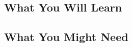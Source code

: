 \subsection{What You Will Learn}

\begin{frame}{\myframetitle{}}
	\lectureseriesoverview[1]
\end{frame}

\subsection{What You Might Need}

\begin{frame}{\myframetitle{}}
\end{frame}

%
%
%
%
